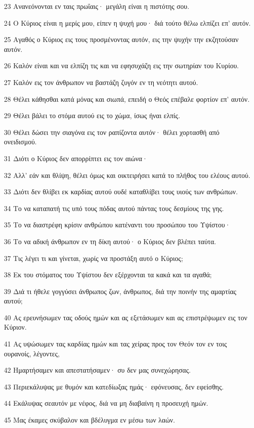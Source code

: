 \par 23 Ανανεόνονται εν ταις πρωΐαις· μεγάλη είναι η πιστότης σου.
\par 24 Ο Κύριος είναι η μερίς μου, είπεν η ψυχή μου· διά τούτο θέλω ελπίζει επ' αυτόν.
\par 25 Αγαθός ο Κύριος εις τους προσμένοντας αυτόν, εις την ψυχήν την εκζητούσαν αυτόν.
\par 26 Καλόν είναι και να ελπίζη τις και να εφησυχάζη εις την σωτηρίαν του Κυρίου.
\par 27 Καλόν εις τον άνθρωπον να βαστάζη ζυγόν εν τη νεότητι αυτού.
\par 28 Θέλει κάθησθαι κατά μόνας και σιωπά, επειδή ο Θεός επέβαλε φορτίον επ' αυτόν.
\par 29 Θέλει βάλει το στόμα αυτού εις το χώμα, ίσως ήναι ελπίς.
\par 30 Θέλει δώσει την σιαγόνα εις τον ραπίζοντα αυτόν· θέλει χορτασθή από ονειδισμού.
\par 31 Διότι ο Κύριος δεν απορρίπτει εις τον αιώνα·
\par 32 Αλλ' εάν και θλίψη, θέλει όμως και οικτειρήσει κατά το πλήθος του ελέους αυτού.
\par 33 Διότι δεν θλίβει εκ καρδίας αυτού ουδέ καταθλίβει τους υιούς των ανθρώπων.
\par 34 Το να καταπατή τις υπό τους πόδας αυτού πάντας τους δεσμίους της γης.
\par 35 Το να διαστρέφη κρίσιν ανθρώπου κατέναντι του προσώπου του Υψίστου·
\par 36 Το να αδική άνθρωπον εν τη δίκη αυτού· ο Κύριος δεν βλέπει ταύτα.
\par 37 Τις λέγει τι και γίνεται, χωρίς να προστάξη αυτό ο Κύριος;
\par 38 Εκ του στόματος του Υψίστου δεν εξέρχονται τα κακά και τα αγαθά;
\par 39 Διά τι ήθελε γογγύσει άνθρωπος ζων, άνθρωπος, διά την ποινήν της αμαρτίας αυτού;
\par 40 Ας ερευνήσωμεν τας οδούς ημών και ας εξετάσωμεν και ας επιστρέψωμεν εις τον Κύριον.
\par 41 Ας υψώσωμεν τας καρδίας ημών και τας χείρας προς τον Θεόν τον εν τοις ουρανοίς, λέγοντες,
\par 42 Ημαρτήσαμεν και απεστατήσαμεν· συ δεν μας συνεχώρησας.
\par 43 Περιεκάλυψας με θυμόν και κατεδίωξας ημάς· εφόνευσας, δεν εφείσθης.
\par 44 Εκάλυψας σεαυτόν με νέφος, διά να μη διαβαίνη η προσευχή ημών.
\par 45 Μας έκαμες σκύβαλον και βδέλυγμα εν μέσω των λαών.
